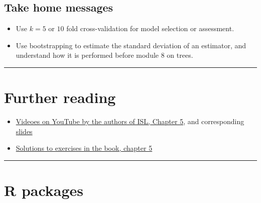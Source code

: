 \documentclass[]{article}
\providecommand{\tightlist}{%
  \setlength{\itemsep}{0pt}\setlength{\parskip}{0pt}}
\begin{document}
\subsection{Take home messages}\label{take-home-messages}

\begin{itemize}
\tightlist
\item
  Use \(k=5\) or \(10\) fold cross-validation for model selection or
  assessment.
\item
  Use bootstrapping to estimate the standard deviation of an estimator,
  and understand how it is performed before module 8 on trees.
\end{itemize}

\begin{center}\rule{0.5\linewidth}{\linethickness}\end{center}

\section{ Further reading }\label{further-reading}

\begin{itemize}
\tightlist
\item
  \href{https://www.youtube.com/playlist?list=PL5-da3qGB5IA6E6ZNXu7dp89_uv8yocmf}{Videoes
  on YouTube by the authors of ISL, Chapter 5}, and corresponding
  \href{https://lagunita.stanford.edu/c4x/HumanitiesScience/StatLearning/asset/cv_boot.pdf}{slides}
\item
  \href{https://rstudio-pubs-static.s3.amazonaws.com/65561_43c0eaaa8565414eae333b47038f716c.html}{Solutions
  to exercises in the book, chapter 5}
\end{itemize}

\begin{center}\rule{0.5\linewidth}{\linethickness}\end{center}

\section{ R packages}\label{r-packages}

\footnotesize
\end{document}
